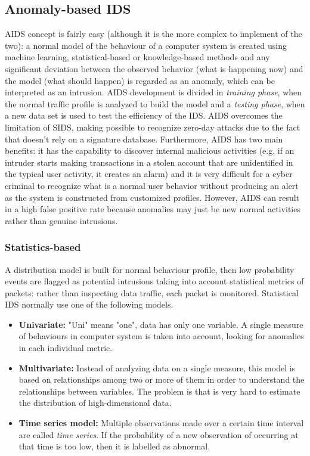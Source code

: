 \subsection{Anomaly-based IDS}
AIDS concept is fairly easy (although it is the more complex to implement of the two): a normal model of the behaviour of a computer system is created using machine learning, statistical-based or knowledge-based methods and any significant deviation between the observed behavior (what is happening now) and the model (what should happen) is regarded as an anomaly, which can be interpreted as an intrusion. AIDS development is divided in \textit{training phase}, when the normal traffic profile is analyzed to build the model and a \textit{testing phase}, when a new data set is used to test the efficiency of the IDS. AIDS overcomes the limitation of SIDS, making possible to recognize zero-day attacks due to the fact that doesn't rely on a signature database. Furthermore, AIDS has two main benefits: it has the capability to discover internal malicious activities (e.g. if an intruder starts making transactions in a stolen account that are unidentified in the typical user activity, it creates an alarm) and it is very difficult for a cyber criminal to recognize what is a normal user behavior without producing an alert as the system is constructed from customized profiles. However, AIDS can result in a high false positive rate because anomalies may just be new normal activities rather than genuine intrusions.
\subsubsection{Statistics-based}
A distribution model is built for normal behaviour profile, then low probability events are flagged as potential intrusions taking into account statistical metrics of packets: rather than inspecting data traffic, each packet is monitored. Statistical IDS normally use one of the following models.
\begin{itemize}
    \item \textbf{Univariate:} "Uni" means "one", data has only one variable. A single measure of behaviours in computer system is taken into account, looking for anomalies in each individual metric.
    \item \textbf{Multivariate:} Instead of analyzing data on a single measure, this model is based on relationships among two or more of them in order to understand the relationships between variables. The problem is that is very hard to estimate the distribution of high-dimensional data.
    \item \textbf{Time series model:} Multiple observations made over a certain time interval are called \textit{time series}. If the probability of a new observation of occurring at that time is too low, then it is labelled as abnormal.
\end{itemize}
